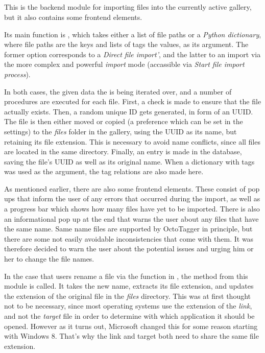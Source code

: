 \subsection{}
\def\kapitelautor{Erik Ritschl}

This is the backend module for importing files into the currently active
gallery, but it also contains some frontend elements.

Its main function is , which takes either a
list of file paths or a \emph{Python dictionary}, where file paths are the keys and
lists of tags the values, as its argument. The former option corresponds to a
\emph{Direct file import'}, and the latter to an import via the more complex and
powerful \emph{import} mode (accassible via \emph{Start file import process}).

In both cases, the given data the is being iterated over, and a number of
procedures are executed for each file. First, a check is made to ensure that
the file actually exists. Then, a random unique ID gets generated, in form of
an UUID. The file is then either moved or copied (a preference
which can be set in the settings) to the \emph{files} folder in the gallery,
using the UUID as its name, but retaining its file extension. This is necessary to avoid name
conflicts, since all files are located in the same directory. Finally, an entry
is made in the database, saving the file's UUID as well as its
original name. When a dictionary with tags was used as the argument, the tag relations
are also made here.

As mentioned earlier, there are also some frontend elements. These consist of
pop ups that inform the user of any errors that occurred during the import, as
well as a progress bar which shows how many files have yet to be imported.
There is also an informational pop up at the end that warns the user about any
files that have the same name. Same name files are supported by OctoTagger in
principle, but there are some not easily avoidable inconsistencies that come
with them. It was therefore decided to warn the user about the potential issues
and urging him or her to change the file names.

In the case that users rename a file via the  function in , the method  from this module is called. It takes the new name, extracts its file extension, and updates the extension of the original file in the \emph{files} directory. This was at first thought not to be necessary, since most operating systems use the extension of the \emph{link}, and not the \emph{target} file in order to determine with which application it should be opened. However as it turns out, Microsoft changed this for some reason starting with Windows 8. That's why the link and target both need to share the same file extension.